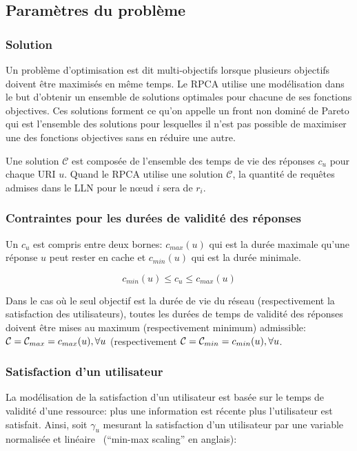 \subsection{Paramètres du problème}

\subsubsection{Solution}

Un problème d'optimisation est dit multi-objectifs lorsque plusieurs objectifs doivent être maximisés en même temps.
Le \ac{RPCA} utilise une modélisation dans le but d'obtenir un ensemble de solutions optimales pour chacune de ses fonctions objectives.
Ces solutions forment ce qu'on appelle un front non dominé de Pareto qui est l'ensemble des solutions pour lesquelles il n'est pas possible de maximiser une des fonctions objectives sans en réduire une autre.

Une solution $\mathcal{C}$ est composée de l'ensemble des temps de vie des réponses $c_u$ pour chaque \ac{URI} $u$.
Quand le \ac{RPCA} utilise une solution $\mathcal{C}$, la quantité de requêtes admises dans le \ac{LLN} pour le nœud $i$ sera de $r_i$.

\subsubsection{Contraintes pour les durées de validité des réponses}

Un $c_u$ est compris entre deux bornes: $c_{max}(u)$ qui est la durée maximale qu'une réponse $u$ peut rester en cache et $c_{min}(u)$ qui est la durée minimale.

\[ c_{min}(u) \leq c_u \leq c_{max}(u)\]

Dans le cas où le seul objectif est la durée de vie du réseau (respectivement la satisfaction des utilisateurs), toutes les durées de temps de validité des réponses doivent être mises au maximum (respectivement minimum) admissible: $\mathcal{C} = \mathcal{C}_{max} = c_{max}(u), \forall u$ (respectivement $\mathcal{C} = \mathcal{C}_{min} = c_{min}(u), \forall u$.

\subsubsection{Satisfaction d'un utilisateur}

La modélisation de la satisfaction d'un utilisateur est basée sur le temps de validité d'une ressource: plus une information est récente plus l'utilisateur est satisfait.
Ainsi, soit $\gamma_u$ mesurant la satisfaction d'un utilisateur par une variable normalisée et linéaire~\cite{harrington2012machine} (``min-max scaling'' en anglais):

